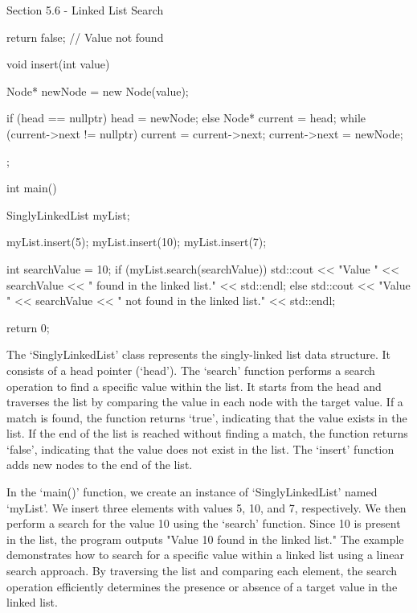 \begin{notes}{Section 5.6 - Linked List Search}
\begin{highlight}
\begin{code}[C++]
{{            return false;  // Value not found
        }
    
        void insert(int value) {
            Node* newNode = new Node(value);
    
            if (head == nullptr) {
                head = newNode;
            } else {
                Node* current = head;
                while (current->next != nullptr) {
                    current = current->next;
                }
                current->next = newNode;
            }
        }
    };
    
    int main() {
        SinglyLinkedList myList;
    
        myList.insert(5);
        myList.insert(10);
        myList.insert(7);
    
        int searchValue = 10;
        if (myList.search(searchValue)) {
            std::cout << "Value " << searchValue << " found in the linked list." 
            << std::endl;
        } else {
            std::cout << "Value " << searchValue << " not found in the linked list." 
            << std::endl;
        }
    
        return 0;
    }
    \end{code}
        The `SinglyLinkedList' class represents the singly-linked list data structure. It consists of a head pointer (`head'). The `search' function performs a search operation to find a specific value within the list. It starts from the head and traverses the list by comparing the value in each 
        node with the target value. If a match is found, the function returns `true', indicating that the value exists in the list. If the end of the list is reached without finding a match, the function returns `false', indicating that the value does not exist in the list. The `insert' function 
        adds new nodes to the end of the list.
    
        In the `main()' function, we create an instance of `SinglyLinkedList' named `myList'. We insert three elements with values 5, 10, and 7, respectively. We then perform a search for the value 10 using the `search' function. Since 10 is present in the list, the program outputs "Value 10 found 
        in the linked list." The example demonstrates how to search for a specific value within a linked list using a linear search approach. By traversing the list and comparing each element, the search operation efficiently determines the presence or absence of a target value in the linked list.
    \end{highlight}
\end{notes}

